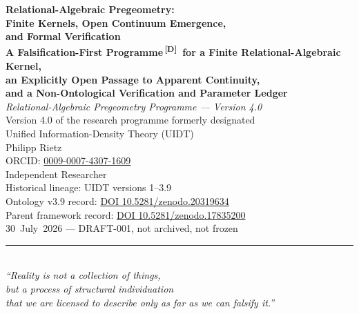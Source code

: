 \documentclass[12pt,a4paper,twoside]{article}
\theoremstyle{plain}
\theoremstyle{definition}
\theoremstyle{remark}
\newcommand{\catmark}[1]{\textsuperscript{\textsf{\textbf{[#1]}}}}
\begin{document}
\pagestyle{uidtontology}

\begin{titlepage}
\vspace*{1.6cm}
\begin{center}
{\LARGE\bfseries Relational-Algebraic Pregeometry:\\[0.25em]
Finite Kernels, Open Continuum Emergence,\\[0.25em]
and Formal Verification}\\[0.9em]
{\small\bfseries A Falsification-First Programme\,\catmark{D}\ for a Finite Relational-Algebraic Kernel,\\[0.25em]
an Explicitly Open Passage to Apparent Continuity,\\[0.25em]
and a Non-Ontological Verification and Parameter Ledger}\\[1.5em]
{\large\itshape Relational-Algebraic Pregeometry Programme --- Version 4.0}\\[0.5em]
{\small Version 4.0 of the research programme formerly designated\\
Unified Information-Density Theory (UIDT)}\\[2.6em]
{\small Philipp Rietz}\\[0.5em]
{\small ORCID: \href{https://orcid.org/0009-0007-4307-1609}{0009-0007-4307-1609}}\\[0.2em]
{\small Independent Researcher}\\[3em]
{\normalsize Historical lineage: UIDT versions 1--3.9}\\[0.5em]
{\small Ontology v3.9 record:
\href{https://doi.org/10.5281/zenodo.20319634}{DOI 10.5281/zenodo.20319634}}\\[0.25em]
{\small Parent framework record:
\href{https://doi.org/10.5281/zenodo.17835200}{DOI 10.5281/zenodo.17835200}}\\[0.5em]
{\small 30~July~2026 --- DRAFT-001, not archived, not frozen}\\[2.2em]
\rule{0.6\textwidth}{0.4pt}\\[1em]
{\small\itshape ``Reality is not a collection of things,\\
but a process of structural individuation\\
that we are licensed to describe only as far as we can falsify it.''}\\[1.4em]
\end{center}
\end{titlepage}
\end{document}
